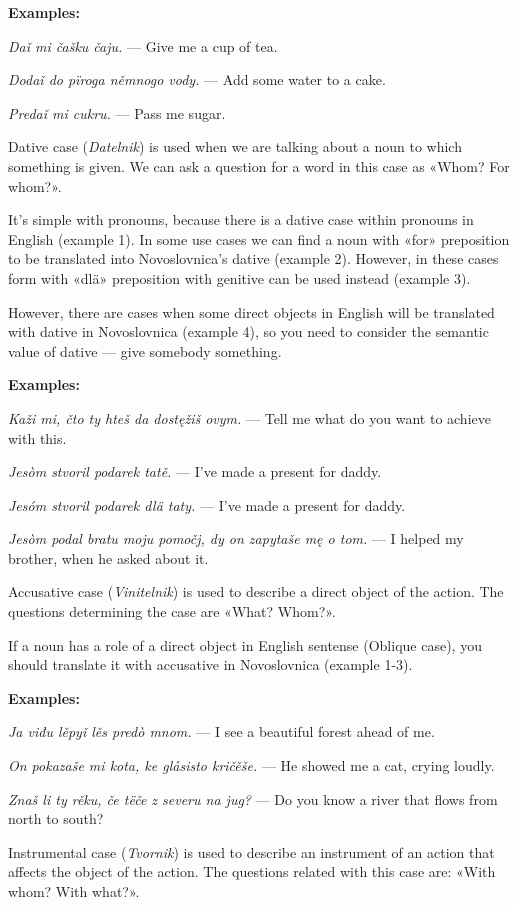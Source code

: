 \textbf{Examples:}

\textit{Daǐ mi čašku čaju.} — Give me a cup of tea.

\textit{Dodaǐ do pïroga němnogo vody.} — Add some water to a cake.

\textit{Predaǐ mi cukru.} — Pass me sugar.

Dative case (\textit{Datelnik}) is used when we are talking about a noun to which something is given. We can ask a question for a word in this case as «Whom? For whom?».

It's simple with pronouns, because there is a dative case within pronouns in English (example 1). In some use cases we can find a noun with «for» preposition to be translated into Novoslovnica's dative (example 2). However, in these cases form with «dlä» preposition with genitive can be used instead (example 3).

However, there are cases when some direct objects in English will be translated with dative in Novoslovnica (example 4), so you need to consider the semantic value of dative — give somebody something.

\textbf{Examples:}

\textit{Kaži mi, čto ty hteš da dostęžiš ovym.} — Tell me what do you want to achieve with this.

\textit{Jesòm stvoril podarek tatě.} — I've made a present for daddy.

\textit{Jesóm stvoril podarek dlä taty.} — I've made a present for daddy.

\textit{Jesòm podal bratu moju pomočj, dy on zapytaše mę o tom.} — I helped my brother, when he asked about it.

Accusative case (\textit{Vinitelnik}) is used to describe a direct object of the action. The questions determining the case are «What? Whom?».

If a noun has a role of a direct object in English sentense (Oblique case), you should translate it with accusative in Novoslovnica (example 1-3).

\textbf{Examples:}

\textit{Ja viđu lěpyǐ lěs predò mnom.} — I see a beautiful forest ahead of me.

\textit{On pokazaše mi kota, ke glåsisto kričěše.} — He showed me a cat, crying loudly.

\textit{Znaš li ty rěku, če tëče z severu na jug?} — Do you know a river that flows from north to south?

Instrumental case (\textit{Tvornik}) is used to describe an instrument of an action that affects the object of the action. The questions related with this case are: «With whom? With what?».


